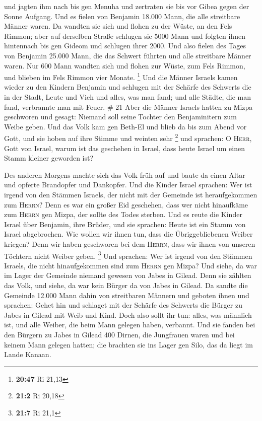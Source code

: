 und jagten ihm nach bis gen Menuha und zertraten sie bis vor Gibea gegen
der Sonne Aufgang.  Und es fielen von Benjamin 18.000
Mann, die alle streitbare Männer waren.  Da wandten sie
sich und flohen zu der Wüste, an den Fels Rimmon; aber auf derselben
Straße schlugen sie 5000 Mann und folgten ihnen hintennach bis gen
Gideom und schlugen ihrer 2000.  Und also fielen des
Tages von Benjamin 25.000 Mann, die das Schwert führten und alle
streitbare Männer waren.  Nur 600 Mann wandten sich und
flohen zur Wüste, zum Fels Rimmon, und blieben im Fels Rimmon vier
Monate. \footnote{\textbf{20:47} Ri 21,13}  Und die
Männer Israels kamen wieder zu den Kindern Benjamin und schlugen mit der
Schärfe des Schwerts die in der Stadt, Leute und Vieh und alles, was man
fand; und alle Städte, die man fand, verbrannte man mit Feuer. \# 21
 Aber die Männer Israels hatten zu Mizpa geschworen und
gesagt: Niemand soll seine Tochter den Benjaminitern zum Weibe geben.
 Und das Volk kam gen Beth-El und blieb da bis zum Abend
vor Gott, und sie hoben auf ihre Stimme und weinten sehr \footnote{\textbf{21:2}
  Ri 20,18}  und sprachen: O \textsc{Herr}, Gott von
Israel, warum ist das geschehen in Israel, dass heute Israel um einen
Stamm kleiner geworden ist?

 Des anderen Morgens machte sich das Volk früh auf und
baute da einen Altar und opferte Brandopfer und Dankopfer.
 Und die Kinder Israel sprachen: Wer ist irgend von den
Stämmen Israels, der nicht mit der Gemeinde ist heraufgekommen zum
\textsc{Herrn}? Denn es war ein großer Eid geschehen, dass wer nicht
hinaufkäme zum \textsc{Herrn} gen Mizpa, der sollte des Todes sterben.
 Und es reute die Kinder Israel über Benjamin, ihre
Brüder, und sie sprachen: Heute ist ein Stamm von Israel abgebrochen.
 Wie wollen wir ihnen tun, dass die Übriggebliebenen
Weiber kriegen? Denn wir haben geschworen bei dem \textsc{Herrn}, dass
wir ihnen von unseren Töchtern nicht Weiber geben. \footnote{\textbf{21:7}
  Ri 21,1}  Und sprachen: Wer ist irgend von den Stämmen
Israels, die nicht hinaufgekommen sind zum \textsc{Herrn} gen Mizpa? Und
siehe, da war im Lager der Gemeinde niemand gewesen von Jabes in Gilead.
 Denn sie zählten das Volk, und siehe, da war kein Bürger
da von Jabes in Gilead.  Da sandte die Gemeinde 12.000
Mann dahin von streitbaren Männern und geboten ihnen und sprachen: Gehet
hin und schlaget mit der Schärfe des Schwerts die Bürger zu Jabes in
Gilead mit Weib und Kind.  Doch also sollt ihr tun:
alles, was männlich ist, und alle Weiber, die beim Mann gelegen haben,
verbannt.  Und sie fanden bei den Bürgern zu Jabes in
Gilead 400 Dirnen, die Jungfrauen waren und bei keinem Mann gelegen
hatten; die brachten sie ins Lager gen Silo, das da liegt im Lande
Kanaan.

